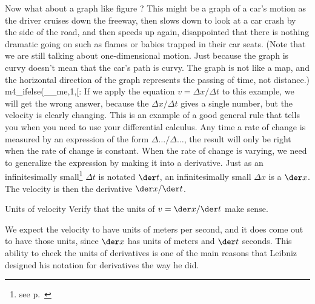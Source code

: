 Now what about a graph like figure ?  This might be a
graph of a car's motion as the driver cruises down the
freeway, then slows down to look at a car crash by the side
of the road, and then speeds up again, disappointed that
there is nothing dramatic going on such as flames or babies
trapped in their car seats.  (Note that we are still talking
about one-dimensional motion.  Just because the graph is
curvy doesn't mean that the car's path is curvy.  The graph
is not like a map, and the horizontal direction of the graph
represents the passing of time, not distance.)
m4_ifelse(__me,1,[:
If we apply the equation $v=\Delta x/\Delta t$ to this example, we will get
the wrong answer, because the  $\Delta x/\Delta t$ gives a single number, but the velocity
is clearly changing. This is an example of a good general rule that tells you when you need to use your differential
calculus. Any time a rate of change is measured by an expression of the form $\Delta\ldots/\Delta\ldots$,
the result will only be right when the rate of change is constant. When the rate of change is varying, we
need to generalize the expression by making it into a derivative.
Just as an infinitesimally small\footnote{see p.~\pageref{infinitesimals}} $\Delta t$ is notated $\der t$, an infinitesimally
small $\Delta x$ is a $\der x$. The velocity is then the derivative $\der x/\der t$.

\begin{eg}{Units of velocity}
\egquestion
Verify that the units of $v=\der x/\der t$ make sense.

\eganswer
We expect the velocity to have units of meters per second, and it does come out to have those units, since
$\der x$ has units of meters and $\der t$ seconds. This ability to check the units of derivatives is one of the
main reasons that Leibniz designed his notation for derivatives the way he did.
\end{eg}

